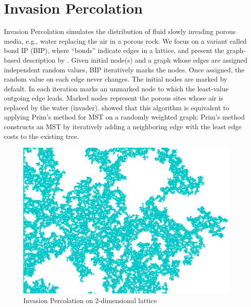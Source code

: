 \section{Invasion Percolation}

Invasion Percolation \cite{wilkinson1983invasion} simulates the distribution of fluid slowly %
invading porous media, e.g., water replacing the air in a porous rock.
We focus on a variant called bond IP (BIP), where ``bonds'' indicate edges in a lattice, and present the graph-based description by \citeauthor{barabasi1996invasion} \citeyear{barabasi1996invasion}.
Given initial node(s) and a graph whose edges are assigned independent random values,
BIP iteratively marks the nodes.
Once assigned, the random value on each edge never changes.  The initial nodes are marked by default.
In each iteration marks an unmarked node to which the least-value outgoing edge leads.
Marked nodes represent the porous sites whose air is replaced by the water (invader).
\citeauthor{barabasi1996invasion} \citeyear{barabasi1996invasion} showed that
this algorithm is equivalent to applying Prim's method for MST \cite{prim1957shortest} on a randomly weighted graph:
Prim's method constructs an MST by iteratively adding a neighboring edge with the least edge costs
to the existing tree.


\begin{figure}[tb]
 \centering
 \includegraphics[width=0.4\linewidth]{img/static/ip.png}
 \caption{Invasion Percolation on 2-dimensional lattice}
 \label{fig:ip}
\end{figure}


